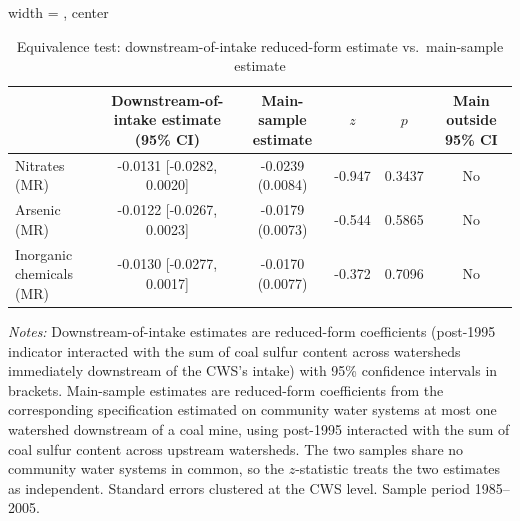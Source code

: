 \begin{table}[htbp]
   \caption{\label{tab:placebo_equivalence_downstream_intake} Equivalence test: downstream-of-intake reduced-form estimate vs.\ main-sample estimate}
   \centering
   \begin{adjustbox}{width = \textwidth, center}
   \begin{tabular}{lccccc}
   \toprule
    & Downstream-of-intake estimate (95\% CI) & Main-sample estimate & $z$ & $p$ & Main outside 95\% CI \\
   \midrule
   Nitrates (MR) & -0.0131 [-0.0282, 0.0020] & -0.0239 (0.0084) & -0.947 & 0.3437 & No \\
   Arsenic (MR) & -0.0122 [-0.0267, 0.0023] & -0.0179 (0.0073) & -0.544 & 0.5865 & No \\
   Inorganic chemicals (MR) & -0.0130 [-0.0277, 0.0017] & -0.0170 (0.0077) & -0.372 & 0.7096 & No \\
   \bottomrule
   \end{tabular}
   \end{adjustbox}
   {\tiny\linespread{1}\selectfont \par \raggedright
   \textit{Notes:} Downstream-of-intake estimates are reduced-form coefficients (post-1995 indicator interacted with the sum of coal sulfur content across watersheds immediately downstream of the CWS's intake) with 95\% confidence intervals in brackets. Main-sample estimates are reduced-form coefficients from the corresponding specification estimated on community water systems at most one watershed downstream of a coal mine, using post-1995 interacted with the sum of coal sulfur content across upstream watersheds. The two samples share no community water systems in common, so the $z$-statistic treats the two estimates as independent. Standard errors clustered at the CWS level. Sample period 1985--2005.}
\end{table}
